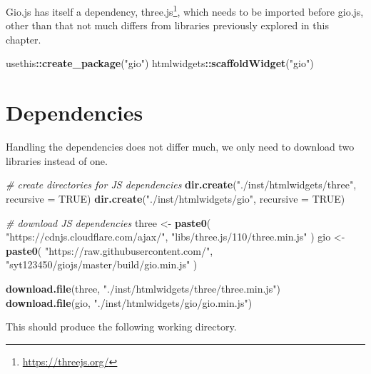 \documentclass[
]{krantz}
\makeatletter
\newenvironment{Shaded}{\begin{snugshade}}{\end{snugshade}}
\newcommand{\CommentTok}[1]{\textcolor[rgb]{0.37,0.37,0.37}{\textit{#1}}}
\newcommand{\DataTypeTok}[1]{\textcolor[rgb]{0.27,0.27,0.27}{#1}}
\newcommand{\KeywordTok}[1]{\textcolor[rgb]{0.27,0.27,0.27}{\textbf{#1}}}
\newcommand{\NormalTok}[1]{#1}
\newcommand{\OperatorTok}[1]{\textcolor[rgb]{0.43,0.43,0.43}{\textbf{#1}}}
\newcommand{\OtherTok}[1]{\textcolor[rgb]{0.37,0.37,0.37}{#1}}
\newcommand{\StringTok}[1]{\textcolor[rgb]{0.5,0.5,0.5}{#1}}
\renewcommand{\href}[2]{#2\footnote{\url{#1}}}
\newenvironment{kframe}{%
\medskip{}
\setlength{\fboxsep}{.8em}
 \def\at@end@of@kframe{}%
 \ifinner\ifhmode%
  \def\at@end@of@kframe{\end{minipage}}%
  \begin{minipage}{\columnwidth}%
 \fi\fi%
 \def\FrameCommand##1{\hskip\@totalleftmargin \hskip-\fboxsep
 \colorbox{shadecolor}{##1}\hskip-\fboxsep
     \hskip-\linewidth \hskip-\@totalleftmargin \hskip\columnwidth}%
 \MakeFramed {\advance\hsize-\width
   \@totalleftmargin\z@ \linewidth\hsize
   \@setminipage}}%
 {\par\unskip\endMakeFramed%
 \at@end@of@kframe}
\renewenvironment{Shaded}{\begin{kframe}}{\end{kframe}}
\makeatother
\begin{document}
Gio.js has itself a dependency, \href{https://threejs.org/}{three.js}, which needs to be imported before gio.js, other than that not much differs from libraries previously explored in this chapter.

\begin{Shaded}
\begin{Highlighting}[]
\NormalTok{usethis}\OperatorTok{::}\KeywordTok{create\_package}\NormalTok{(}\StringTok{"gio"}\NormalTok{)}
\NormalTok{htmlwidgets}\OperatorTok{::}\KeywordTok{scaffoldWidget}\NormalTok{(}\StringTok{"gio"}\NormalTok{)}
\end{Highlighting}
\end{Shaded}

\hypertarget{widgets-full-deps}{%
\section{Dependencies}\label{widgets-full-deps}}

Handling the dependencies does not differ much, we only need to download two libraries instead of one.

\begin{Shaded}
\begin{Highlighting}[]
\CommentTok{\# create directories for JS dependencies}
\KeywordTok{dir.create}\NormalTok{(}\StringTok{"./inst/htmlwidgets/three"}\NormalTok{, }\DataTypeTok{recursive =} \OtherTok{TRUE}\NormalTok{)}
\KeywordTok{dir.create}\NormalTok{(}\StringTok{"./inst/htmlwidgets/gio"}\NormalTok{, }\DataTypeTok{recursive =} \OtherTok{TRUE}\NormalTok{)}

\CommentTok{\# download JS dependencies}
\NormalTok{three \textless{}{-}}\StringTok{ }\KeywordTok{paste0}\NormalTok{(}
  \StringTok{"https://cdnjs.cloudflare.com/ajax/"}\NormalTok{,}
  \StringTok{"libs/three.js/110/three.min.js"}
\NormalTok{)}
\NormalTok{gio \textless{}{-}}\StringTok{ }\KeywordTok{paste0}\NormalTok{(}
  \StringTok{"https://raw.githubusercontent.com/"}\NormalTok{,}
  \StringTok{"syt123450/giojs/master/build/gio.min.js"}
\NormalTok{)}

\KeywordTok{download.file}\NormalTok{(three, }\StringTok{"./inst/htmlwidgets/three/three.min.js"}\NormalTok{)}
\KeywordTok{download.file}\NormalTok{(gio, }\StringTok{"./inst/htmlwidgets/gio/gio.min.js"}\NormalTok{)}
\end{Highlighting}
\end{Shaded}

This should produce the following working directory.
\end{document}
